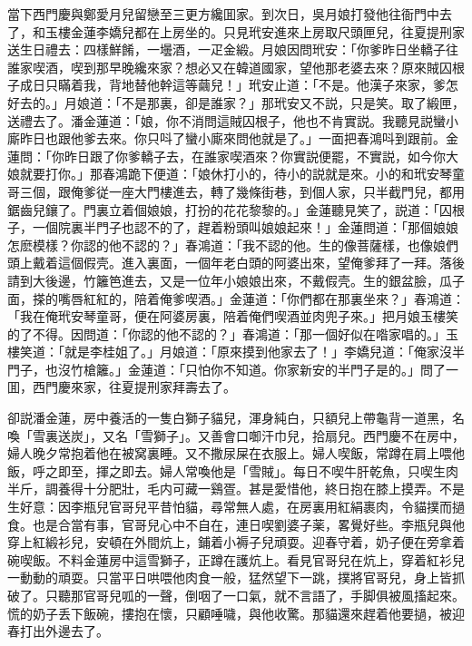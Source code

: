 當下西門慶與鄭愛月兒留戀至三更方纔囬家。到次日，吳月娘打發他往衙門中去了，和玉樓金蓮李嬌兒都在上房坐的。只見玳安進來上房取尺頭匣兒，往夏提刑家送生日禮去：四樣鮮餚，一壜酒，一疋金緞。月娘因問玳安：「你爹昨日坐轎子往誰家喫酒，喫到那早晚纔來家？想必又在韓道國家，望他那老婆去來？原來賊囚根子成日只瞞着我，背地替他幹這等繭兒！」玳安止道：「不是。他漢子來家，爹怎好去的。」月娘道：「不是那裏，卻是誰家？」那玳安又不説，只是笑。取了緞匣，送禮去了。潘金蓮道：「娘，你不消問這賊囚根子，他也不肯實説。我聽見説蠻小廝昨日也跟他爹去來。你只呌了蠻小廝來問他就是了。」一面把春鴻呌到跟前。金蓮問：「你昨日跟了你爹轎子去，在誰家喫酒來？你實説便罷，不實説，如今你大娘就要打你。」那春鴻跪下便道：「娘休打小的，待小的説就是來。小的和玳安琴童哥三個，跟俺爹従一座大門樓進去，轉了幾條街巷，到個人家，只半截門兒，都用鋸齒兒鑲了。門裏立着個娘娘，打扮的花花黎黎的。」金蓮聽見笑了，説道：「囚根子，一個院裏半門子也認不的了，趕着粉頭叫娘娘起來！」金蓮問道：「那個娘娘怎麽模樣？你認的他不認的？」春鴻道：「我不認的他。生的像菩薩樣，也像娘們頭上戴着這個假壳。進入裏面，一個年老白頭的阿婆出來，望俺爹拜了一拜。落後請到大後邊，竹籬笆進去，又是一位年小娘娘出來，不戴假壳。生的銀盆臉，瓜子面，搽的嘴唇紅紅的，陪着俺爹喫酒。」金蓮道：「你們都在那裏坐來？」春鴻道：「我在俺玳安琴童哥，便在阿婆房裏，陪着俺們喫酒並肉兜子來。」把月娘玉樓笑的了不得。因問道：「你認的他不認的？」春鴻道：「那一個好似在喒家唱的。」玉樓笑道：「就是李桂姐了。」月娘道：「原來摸到他家去了！」李嬌兒道：「俺家沒半門子，也沒竹槍籬。」金蓮道：「只怕你不知道。你家新安的半門子是的。」問了一囬，西門慶來家，往夏提刑家拜壽去了。

卻説潘金蓮，房中養活的一隻白獅子貓兒，渾身純白，只額兒上帶龜背一道黑，名喚「雪裏送炭」，又名「雪獅子」。又善會口啣汗巾兒，拾扇兒。西門慶不在房中，婦人晚夕常抱着他在被窝裏睡。又不撒尿屎在衣服上。婦人喫飯，常蹲在肩上喂他飯，呼之即至，揮之即去。婦人常喚他是「雪賊」。每日不喫牛肝乾魚，只喫生肉半斤，調養得十分肥壯，毛内可藏一鷄疍。甚是愛惜他，終日抱在膝上摸弄。不是生好意：因李瓶兒官哥兒平昔怕貓，尋常無人處，在房裏用紅絹裹肉，令貓撲而撾食。也是合當有事，官哥兒心中不自在，連日喫劉婆子薬，畧覺好些。李瓶兒與他穿上紅緞衫兒，安頓在外間炕上，鋪着小褥子兒頑耍。迎春守着，奶子便在旁拿着碗喫飯。不料金蓮房中這雪獅子，正蹲在護炕上。看見官哥兒在炕上，穿着紅衫兒一動動的頑耍。只當平日哄喂他肉食一般，猛然望下一跳，撲將官哥兒，身上皆抓破了。只聽那官哥兒呱的一聲，倒咽了一口氣，就不言語了，手脚俱被風搐起來。慌的奶子丢下飯碗，摟抱在懷，只顧唾噦，與他收驚。那貓還來趕着他要撾，被迎春打出外邊去了。

